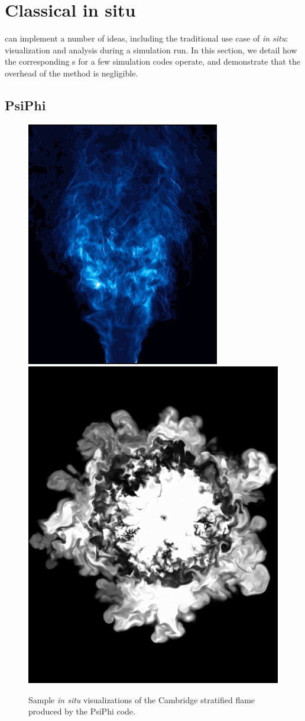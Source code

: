\section{Classical in situ}
\label{sec:classical}

\freeprocessing{} can implement a number of \insitu{} ideas,
including the traditional use case of \textit{in situ}: visualization
and analysis during a simulation run.  In this section, we detail how
the
corresponding \freeprocessor{}s for a few simulation codes operate, and
demonstrate that the overhead of the method is negligible.

\subsection{PsiPhi}
\label{sec:psiphi}

\begin{figure}
  \centering
  \includegraphics[width=0.48\linewidth]{images/fp/PsiPhi-vring.png}
  \includegraphics[width=0.48\linewidth]{images/fp/PsiPhi-slice.png}
  \caption{Sample \textit{in situ} visualizations of the Cambridge
  stratified flame produced by the PsiPhi code.}
  \label{fig:PsiPhi}
\end{figure}

